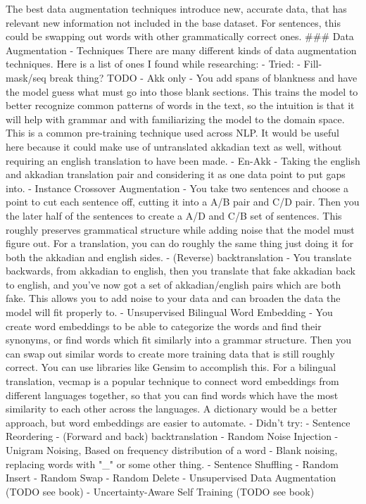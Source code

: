 The best data augmentation techniques introduce new, accurate data, that has relevant new information not included in the base dataset. For sentences, this could be swapping out words with other grammatically correct ones.
### Data Augmentation
- Techniques
There are many different kinds of data augmentation techniques. 
Here is a list of ones I found while researching:
- Tried:
    - Fill-mask/seq break thing? TODO
        - Akk only
            - You add spans of blankness and have the model guess what must go into those blank sections.  This trains the model to better recognize common patterns of words in the text, so the intuition is that it will help with grammar and with familiarizing the model to the domain space. This is a common pre-training technique used across NLP. It would be useful here because it could make use of untranslated akkadian text as well, without requiring an english translation to have been made.
        - En-Akk
            - Taking the english and akkadian translation pair and considering it as one data point to put gaps into.
    - Instance Crossover Augmentation
        - You take two sentences and choose a point to cut each sentence off, cutting it into a A/B pair and C/D pair. Then you the later half of the sentences to create a A/D and C/B set of sentences. This roughly preserves grammatical structure while adding noise that the model must figure out. For a translation, you can do roughly the same thing just doing it for both the akkadian and english sides.
    - (Reverse) backtranslation
        - You translate backwards, from akkadian to english, then you translate that fake akkadian back to english, and you've now got a set of akkadian/english pairs which are both fake. This allows you to add noise to your data and can broaden the data the model will fit properly to.
    - Unsupervised Bilingual Word Embedding
        - You create word embeddings to be able to categorize the words and find their synonyms, or find words which fit similarly into a grammar structure. Then you can swap out similar words to create more training data that is still roughly correct. You can use libraries like Gensim to accomplish this. For a bilingual translation, vecmap is a popular technique to connect word embeddings from different languages together, so that you can find words which have the most similarity to each other across the languages. A dictionary would be a better approach, but word embeddings are easier to automate.
- Didn't try:
    - Sentence Reordering
    - (Forward and back) backtranslation
    - Random Noise Injection
        - Unigram Noising, Based on frequency distribution of a word
        - Blank noising, replacing words with "_" or some other thing.
        - Sentence Shuffling
        - Random Insert
        - Random Swap
        - Random Delete
    - Unsupervised Data Augmentation (TODO see book)
    - Uncertainty-Aware Self Training (TODO see book)


